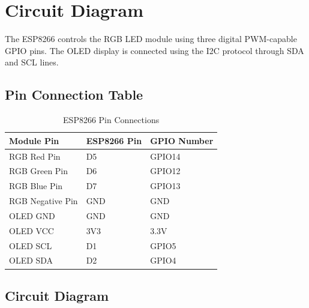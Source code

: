 \documentclass[12pt,a4paper]{report}
\begin{document}
\chapter{Circuit Diagram}

The ESP8266 controls the RGB LED module using three digital PWM-capable GPIO pins. The OLED display is connected using the I2C protocol through SDA and SCL lines.

\section{Pin Connection Table}

\begin{table}[H]
\centering
\renewcommand{\arraystretch}{1.4}
\begin{tabular}{p{4cm} p{4cm} p{4cm}}
\toprule
\textbf{Module Pin} & \textbf{ESP8266 Pin} & \textbf{GPIO Number} \\
\midrule
RGB Red Pin & D5 & GPIO14 \\
RGB Green Pin & D6 & GPIO12 \\
RGB Blue Pin & D7 & GPIO13 \\
RGB Negative Pin & GND & GND \\
OLED GND & GND & GND \\
OLED VCC & 3V3 & 3.3V \\
OLED SCL & D1 & GPIO5 \\
OLED SDA & D2 & GPIO4 \\
\bottomrule
\end{tabular}
\caption{ESP8266 Pin Connections}
\end{table}

\section{Circuit Diagram}
\end{document}
